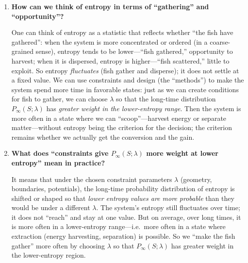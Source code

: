 \documentclass[11pt,a4paper]{article}
\begin{document}
\begin{enumerate}[leftmargin=*]
No. Entropy is only a statistical quantity (a one-dimensional projection of high-dimensional state); it is not the right criterion for deciding whether we can ``get something out'' of the system. The real question is whether \emph{thermal motion is converted into electricity} (or work) or whether \emph{matter is effectively separated} under the given constraints. That is decided by actual energy and mass flows, conversion efficiency, and dynamics---not by computing entropy. So: decide based on whether the conversion happens and whether there is a gain; entropy does not need to be the basis for that decision.

\item \textbf{How can we think of entropy in terms of ``gathering'' and ``opportunity''?}

One can think of entropy as a statistic that reflects whether ``the fish have gathered'': when the system is more concentrated or ordered (in a coarse-grained sense), entropy tends to be lower---``fish gathered,'' opportunity to harvest; when it is dispersed, entropy is higher---``fish scattered,'' little to exploit. So entropy \emph{fluctuates} (fish gather and disperse); it does not settle at a fixed value. We can use constraints and design (the ``methods'') to make the system spend more time in favorable states: just as we can create conditions for fish to gather, we can choose $\lambda$ so that the long-time distribution $P_{\infty}(S;\lambda)$ has \emph{greater weight in the lower-entropy range}. Then the system is more often in a state where we can ``scoop''---harvest energy or separate matter---without entropy being the criterion for the decision; the criterion remains whether we actually get the conversion and the gain.

\item \textbf{What does ``constraints give $P_{\infty}(S;\lambda)$ more weight at lower entropy'' mean in practice?}

It means that under the chosen constraint parameters $\lambda$ (geometry, boundaries, potentials), the long-time probability distribution of entropy is shifted or shaped so that \emph{lower entropy values are more probable} than they would be under a different $\lambda$. The system's entropy still fluctuates over time; it does not ``reach'' and stay at one value. But on average, over long times, it is more often in a lower-entropy range---i.e.\ more often in a state where extraction (energy harvesting, separation) is possible. So we ``make the fish gather'' more often by choosing $\lambda$ so that $P_{\infty}(S;\lambda)$ has greater weight in the lower-entropy region.


\end{enumerate}
\end{document}
